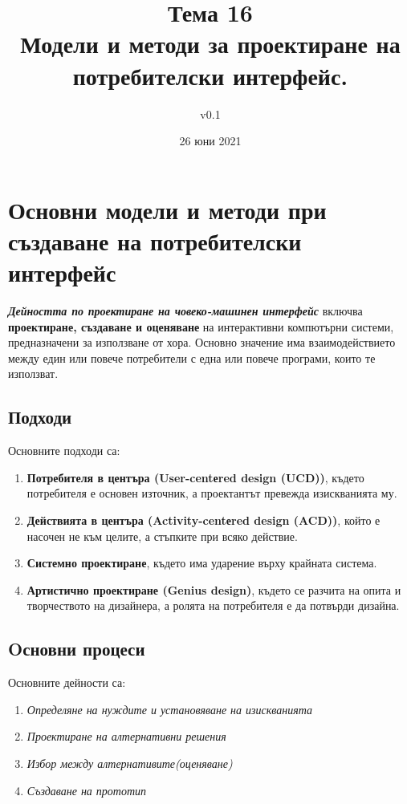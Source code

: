 \documentclass[fleqn,12pt]{article}
\title{Тема 16 \\Модели и методи за проектиране на потребителски интерфейс.}
\author{v0.1}
\date{26 юни 2021}
\begin{document}
\maketitle
\tableofcontents
\pagebreak

\section{Основни  модели  и  методи  при  създаване  на  потребителски  интерфейс}

\textbf{\textit{Дейността по проектиране на човеко-машинен интерфейс}} включва \textbf{проектиране, създаване и оценяване} на интерактивни компютърни системи, предназначени за използване от хора.
\bigbreak
Основно значение има взаимодействието между един или повече потребители с една или повече програми, които те използват. 

\subsection{Подходи}

Основните подходи са:
\begin{enumerate}
    \item \textbf{Потребителя в центъра (User-centеred design (UCD))}, където потребителя е основен източник, а проектантът превежда изискванията му.
    \item \textbf{Действията в центъра (Activity-centеred design (ACD))}, който е насочен не към целите, а стъпките при всяко действие.
    \item \textbf{Системно проектиране}, където има ударение върху крайната система.
    \item \textbf{Артистично проектиране (Genius design)}, където се разчита на опита и творчеството на дизайнера, а ролята на потребителя е да потвърди дизайна.
\end{enumerate}

\subsection{Oсновни процеси}

Основните дейности са:
\begin{enumerate}
    \item \textit{Определяне на нуждите и установяване на изискванията}
    \item \textit{Проектиране на алтернативни решения}
    \item \textit{Избор между алтернативите(оценяване)}
    \item \textit{Създаване на прототип}
\end{enumerate}
\end{document}
